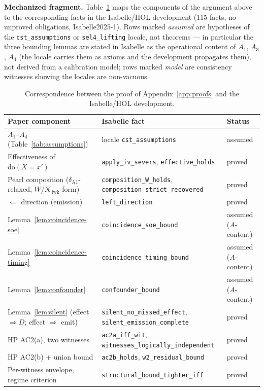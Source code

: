 \documentclass[conference]{IEEEtran}
\newcommand{\Kfwk}{\mathcal{K}_\text{fwk}}
\newcommand{\dox}[1]{\text{do}(X{=}#1)}
\begin{document}
\textbf{Mechanized fragment.} Table~\ref{tab:mechanized} maps the
components of the argument above to the corresponding facts in the
Isabelle/HOL development (115 facts, no unproved obligations,
Isabelle2025-1). Rows marked \emph{assumed} are hypotheses of the
\texttt{cst\_assumptions} or \texttt{sel4\_lifting} locale, not
theorems --- in particular the three bounding lemmas are stated in
Isabelle as the operational content of $A_1$, $A_3$, $A_4$ (the
locale carries them as axioms and the development propagates them),
not derived from a calibration model; rows marked \emph{model} are consistency witnesses
showing the locales are non-vacuous.

\begin{table}[t]
\centering
\footnotesize
\caption{Correspondence between the proof of Appendix~\ref{app:proofs}
and the Isabelle/HOL development.}
\label{tab:mechanized}
\begin{tabular}{@{}lll@{}}
\toprule
Paper component & Isabelle fact & Status \\
\midrule
$A_1$--$A_4$ (Table~\ref{tab:assumptions}) & locale \texttt{cst\_assumptions} & assumed \\
Effectiveness of $\dox{x'}$ & \texttt{apply\_iv\_severs}, \texttt{effective\_holds} & proved \\
Pearl composition ($\delta_{\text{A1}}$-relaxed, $W$/$\Kfwk$ form) & \texttt{composition\_W\_holds}, \texttt{composition\_strict\_recovered} & proved \\
$\Leftarrow$ direction (emission) & \texttt{left\_direction} & proved \\
Lemma~\ref{lem:coincidence-soe} & \texttt{coincidence\_soe\_bound} & assumed ($A$-content) \\
Lemma~\ref{lem:coincidence-timing} & \texttt{coincidence\_timing\_bound} & assumed ($A$-content) \\
Lemma~\ref{lem:confounder} & \texttt{confounder\_bound} & assumed ($A$-content) \\
Lemma~\ref{lem:silent} (effect $\Rightarrow D$; effect $\Rightarrow$ emit) & \texttt{silent\_no\_missed\_effect}, \texttt{silent\_emission\_complete} & proved \\
HP AC2(a), two witnesses & \texttt{ac2a\_iff\_wit}, \texttt{witnesses\_logically\_independent} & proved \\
HP AC2(b) + union bound & \texttt{ac2b\_holds}, \texttt{w2\_residual\_bound} & proved \\
Per-witness envelope, regime criterion & \texttt{structural\_bound\_tighter\_iff} & proved \\

\end{tabular}
\end{table}
\end{document}
